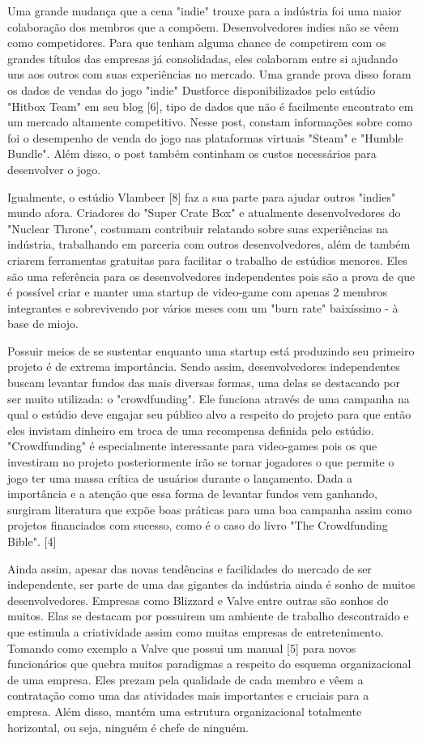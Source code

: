 Uma grande mudança que a cena "indie" trouxe para a indústria foi uma maior colaboração dos membros que a compõem. Desenvolvedores indies não se vêem como competidores. Para que tenham alguma chance de competirem com os grandes títulos das empresas já consolidadas, eles colaboram entre si ajudando uns aos outros com suas experiências no mercado. Uma grande prova disso foram os dados de vendas do jogo "indie" Dustforce disponibilizados pelo estúdio "Hitbox Team" em seu blog [6], tipo de dados que não é facilmente encontrato em um mercado altamente competitivo. Nesse post, constam informações sobre como foi o desempenho de venda do jogo nas plataformas virtuais "Steam" e "Humble Bundle". Além disso, o post também continham os custos necessários para desenvolver o jogo.

Igualmente, o estúdio Vlambeer [8] faz a sua parte para ajudar outros "indies" mundo afora. Criadores do "Super Crate Box" e atualmente desenvolvedores do "Nuclear Throne", costumam contribuir relatando sobre suas experiências na indústria, trabalhando em parceria com outros desenvolvedores, além de também criarem ferramentas gratuitas para facilitar o trabalho de estúdios menores. Eles são uma referência para os desenvolvedores independentes pois são a prova de que é possível criar e manter uma startup de video-game com apenas 2 membros integrantes e sobrevivendo por vários meses com um "burn rate" baixíssimo - à base de miojo.

Possuir meios de se sustentar enquanto uma startup está produzindo seu primeiro projeto é de extrema importância. Sendo assim, desenvolvedores independentes buscam levantar fundos das mais diversas formas, uma delas se destacando por ser muito utilizada: o "crowdfunding". Ele funciona através de uma campanha na qual o estúdio deve engajar seu público alvo a respeito do projeto para que então eles invistam dinheiro em troca de uma recompensa definida pelo estúdio. "Crowdfunding" é especialmente interessante para video-games pois os que investiram no projeto posteriormente irão se tornar jogadores o que permite o jogo ter uma massa crítica de usuários durante o lançamento. Dada a importância e a atenção que essa forma de levantar fundos vem ganhando, surgiram literatura que expõe boas práticas para uma boa campanha assim como projetos financiados com sucesso, como é o caso do livro "The Crowdfunding Bible". [4]

Ainda assim, apesar das novas tendências e facilidades do mercado de ser independente, ser parte de uma das gigantes da indústria ainda é sonho de muitos desenvolvedores. Empresas como Blizzard e Valve entre outras são sonhos de muitos. Elas se destacam por possuirem um ambiente de trabalho descontraido e que estimula a criatividade assim como muitas empresas de entretenimento. Tomando como exemplo a Valve que possui um manual [5] para novos funcionários que quebra muitos paradigmas a respeito do esquema organizacional de uma empresa. Eles prezam pela qualidade de cada membro e vêem a contratação como uma das atividades mais importantes e cruciais para a empresa. Além disso, mantém uma estrutura organizacional totalmente horizontal, ou seja, ninguém é chefe de ninguém.


